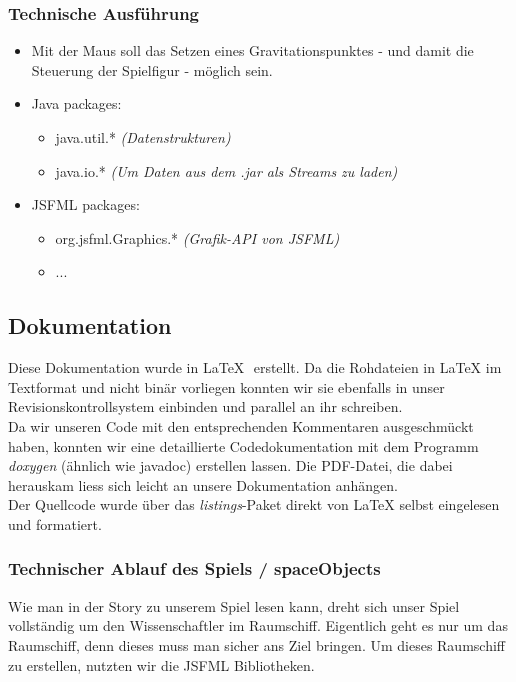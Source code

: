 \documentclass[12pt,a4paper]{scrartcl}
\begin{document}
\subsubsection{Technische Ausführung}
\begin{itemize}
\item Mit der Maus soll das Setzen eines Gravitationspunktes - und damit die Steuerung der Spielfigur - möglich sein.
\item Java packages: \begin{itemize}
	\item java.util.* \textit{(Datenstrukturen)}
	\item java.io.* \textit{(Um Daten aus dem .jar als Streams zu laden)}
\end{itemize}
\item JSFML packages: \begin{itemize}
	\item org.jsfml.Graphics.* \textit{(Grafik-API von JSFML)}
	\item ...
\end{itemize}
\end{itemize}

\subsection{Dokumentation}
Diese Dokumentation wurde in \LaTeX \,\, erstellt. Da die Rohdateien in LaTeX im Textformat und nicht
binär vorliegen konnten wir sie ebenfalls in unser Revisionskontrollsystem einbinden und parallel
an ihr schreiben.\\

Da wir unseren Code mit den entsprechenden Kommentaren ausgeschmückt haben,
konnten wir eine detaillierte Codedokumentation mit dem Programm \textit{doxygen} (ähnlich wie javadoc) erstellen lassen.
Die PDF-Datei, die dabei herauskam liess sich leicht an unsere Dokumentation anhängen.\\

Der Quellcode wurde über das \textit{listings}-Paket direkt von LaTeX selbst eingelesen und formatiert.

\subsubsection{Technischer Ablauf des Spiels / spaceObjects}
Wie man in der Story zu unserem Spiel lesen kann, dreht sich unser Spiel vollständig um den Wissenschaftler im Raumschiff. Eigentlich geht es nur um das Raumschiff, denn dieses muss man sicher ans Ziel bringen.
Um dieses Raumschiff zu erstellen, nutzten wir die JSFML Bibliotheken.	\\
\end{document}
